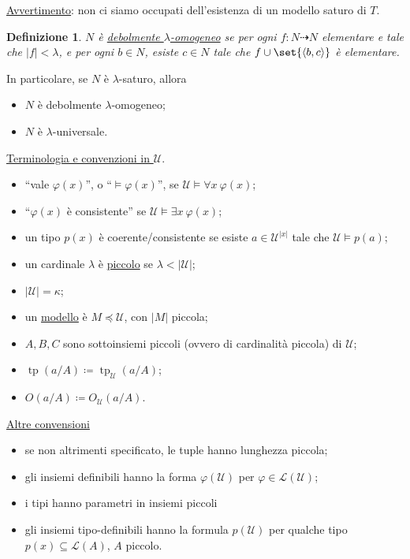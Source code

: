 \documentclass[10pt]{article}
\newcommand{\card}[1]{\left\vert #1 \right\vert}
\newcommand{\1}{\mathds{1}}
\newcommand{\partialto}{\dashrightarrow}
\theoremstyle{definition}%
\theoremstyle{plain}
\newtheorem{definizione}[thm]{Definizione}
\theoremstyle{remark}
\begin{document}
\uline{Avvertimento}: non ci siamo occupati dell'esistenza di un modello saturo di \(T\).

\begin{definizione}
\(N\) è \uline{debolmente \(\lambda\)-omogeneo} se per ogni \(f:N\partialto N\) elementare e tale che \(\card{f}<\lambda\), e per ogni \(b \in N\), esiste \(c \in N\) tale che \(f\cup\set{\langle b,c\rangle}\) è elementare.
\end{definizione}

In particolare, se \(N\) è \(\lambda\)-saturo, allora
\begin{itemize}
\item \(N\) è debolmente \(\lambda\)-omogeneo;
\item \(N\) è \(\lambda\)-universale.
\end{itemize}

\uline{Terminologia e convenzioni in \(\mathcal{U}\)}.
\begin{itemize}
\item ``vale \(\varphi(x)\)'', o ``\(\vDash\varphi(x)\)'', se \(\mathcal{U}\vDash \forall x \ \varphi(x)\);
\item ``\(\varphi(x)\) è consistente'' se \(\mathcal{U}\vDash \exists x\ \varphi(x)\);
\item un tipo \(p(x)\) è coerente/consistente se esiste \(a \in \mathcal{U}^{|x|}\) tale che \(\mathcal{U}\vDash p(a)\);
\item un cardinale \(\lambda\) è \uline{piccolo} se \(\lambda<\card{\mathcal{U}}\);
\item \(\card{\mathcal{U}}=\kappa\);
\item un \uline{modello} è \(M\preceq\mathcal{U}\), con \(\card{M}\) piccola;
\item \(A,B,C\) sono sottoinsiemi piccoli (ovvero di cardinalità piccola) di \(\mathcal{U}\);
\item \(\operatorname{tp}(a/A) \coloneqq \operatorname{tp}_{\mathcal{U}}(a/A)\);
\item \(O(a/A) \coloneqq O_{\mathcal{U}}(a/A)\).
\end{itemize}

\uline{Altre convensioni}
\begin{itemize}
\item se non altrimenti specificato, le tuple hanno lunghezza piccola;
\item gli insiemi definibili hanno la forma \(\varphi(\mathcal{U})\) per \(\varphi \in \mathcal{L}(\mathcal{U})\);
\item i tipi hanno parametri in insiemi piccoli
\item gli insiemi tipo-definibili hanno la formula \(p(\mathcal{U})\) per qualche tipo \(p(x) \subseteq \mathcal{L}(A)\), \(A\) piccolo.
\end{itemize}
\end{document}

